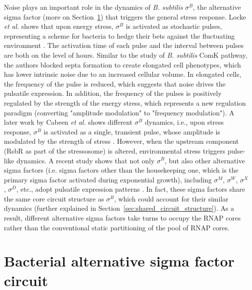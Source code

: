 Noise plays an important role in the dynamics of \textit{B. subtilis}
$\sigma^B$, the alternative sigma factor 
(more on Section~\ref{sec:alternative_sigma_factor})
that triggers the general stress response.
Locke \textit{et al.} shows that upon energy stress, $\sigma^B$ is
activated as stochastic pulses, representing a scheme for
bacteria to hedge their bets against the fluctuating environment
\cite{locke11}.
The activation time of each pulse and the interval between pulses
are both on the level of hours.
Similar to the study of \textit{B. subtilis} ComK pathway,
the authors blocked septa formation to create elongated cell phenotypes,
which has lower intrinsic noise due to an increased cellular volume.
In elongated cells, the frequency of the pulse is reduced, which
suggests that noise drives the pulsatile expression.
In addition, the frequency of the pulses is positively regulated by
the strength of the energy stress, which represents a new regulation
paradigm (converting "amplitude modulation" to "frequency modulation").
A later work by Cabeen \textit{et al.} shows different $\sigma^B$
dynamics, i.e., upon stress response, $\sigma^B$ is activated as
a single, transient pulse, whose amplitude is modulated by 
the strength of stress \cite{cabeen17}.
However, when the upstream component (RsbR as part of the stressosome)
is altered, environmental stress triggers pulse-like dynamics.
A recent study shows that not only $\sigma^B$, but also other
alternative sigma factors (i.e. sigma factors other than
the housekeeping one, which is the primary sigma factor
activated during exponential growth), 
including $\sigma^M$, $\sigma^W$,
$\sigma^X$, $\sigma^D$, etc., adopt pulsatile expression patterns
\cite{park18a}.
In fact, these sigma factors share the same core circuit structure
as $\sigma^B$, which could account for their similar dynamics
(further explained in Section~\ref{sec:shared_circuit_structure}).
As a result, different alternative sigma factors take turns to
occupy the RNAP cores rather than the conventional 
static partitioning of the pool of RNAP cores.


\section{Bacterial alternative sigma factor circuit}
\label{sec:alternative_sigma_factor}

